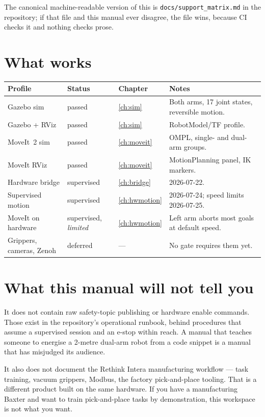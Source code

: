 The canonical machine-readable version of this is
\texttt{docs/support\_matrix.md} in the repository; if that file and this manual
ever disagree, the file wins, because CI checks it and nothing checks prose.

\section{What works}

\begin{table}[h]
\centering
\small
\begin{tabularx}{\linewidth}{@{}lllX@{}}
\toprule
\textbf{Profile} & \textbf{Status} & \textbf{Chapter} & \textbf{Notes} \\
\midrule
Gazebo sim & passed & \ref{ch:sim} & Both arms, 17 joint states, reversible motion. \\
Gazebo + RViz & passed & \ref{ch:sim} & RobotModel/TF profile. \\
MoveIt~2 sim & passed & \ref{ch:moveit} & OMPL, single- and dual-arm groups. \\
MoveIt RViz & passed & \ref{ch:moveit} & MotionPlanning panel, IK markers. \\
Hardware bridge & supervised & \ref{ch:bridge} & 2026-07-22. \\
Supervised motion & supervised & \ref{ch:hwmotion} & 2026-07-24; speed limits 2026-07-25. \\
MoveIt on hardware & supervised, \emph{limited} & \ref{ch:hwmotion} & Left arm aborts most goals at default speed. \\
Grippers, cameras, Zenoh & deferred & --- & No gate requires them yet. \\
\bottomrule
\end{tabularx}
\end{table}

\section{What this manual will not tell you}

It does not contain raw safety-topic publishing or hardware enable commands.
Those exist in the repository's operational runbook, behind procedures that
assume a supervised session and an e-stop within reach. A manual that teaches
someone to energise a 2-metre dual-arm robot from a code snippet is a manual that
has misjudged its audience.

It also does not document the Rethink Intera manufacturing workflow --- task
training, vacuum grippers, Modbus, the factory pick-and-place tooling. That is a
different product built on the same hardware. If you have a manufacturing Baxter
and want to train pick-and-place tasks by demonstration, this workspace is not
what you want.

